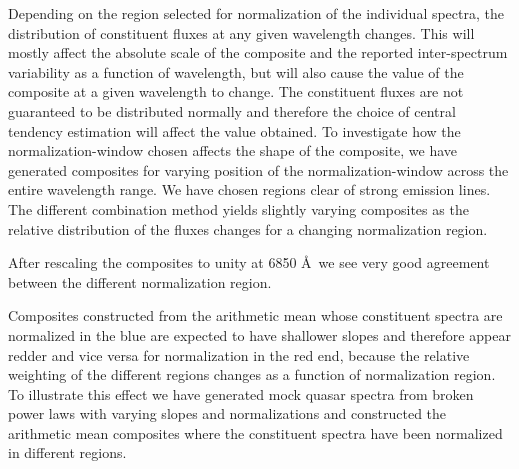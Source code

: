 \documentclass{aa}    %
\newcommand{\figref}[1]{\ref{fig:#1}}
\newcommand{\Fig}[1]{\figurename~\figref{#1}}
\newcommand{\fig}[1]{\Fig{#1}}
\newcommand{\figlabel}[1]{\label{fig:#1}}
\newcommand{\todo}[3]{{\color{#2}\emph{#1}: #3}}
\newcommand{\jstodo}[1]{\todo{TODO }{green}{#1}}
\begin{document}
Depending on the region selected for normalization of the individual spectra, the distribution of constituent fluxes at any given wavelength changes. This will mostly affect the absolute scale of the composite and the reported inter-spectrum variability as a function of wavelength, but will also cause the value of the composite at a given wavelength to change. The constituent fluxes are not guaranteed to be distributed normally and therefore the choice of central tendency estimation will affect the value obtained. To investigate how the normalization-window chosen affects the shape of the composite, we have generated composites for varying position of the normalization-window across the entire wavelength range. We have chosen regions clear of strong emission lines. The different combination method yields slightly varying composites as the relative distribution of the fluxes changes for a changing normalization region.



After rescaling the composites to unity at 6850 \AA~we see very good agreement between the different normalization region. 

Composites constructed from the arithmetic mean whose constituent spectra are normalized in the blue are expected to have shallower slopes and therefore appear redder and vice versa for normalization in the red end, because the relative weighting of the different regions changes as a function of normalization region. To illustrate this effect we have generated mock quasar spectra from broken power laws with varying slopes and normalizations and constructed the arithmetic mean composites where the constituent spectra have been normalized in different regions. 

%
\end{document}
